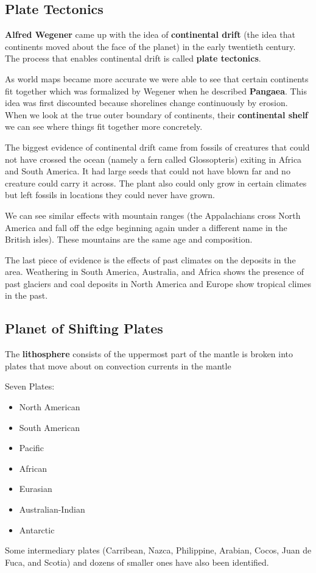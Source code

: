\documentclass{article}
\begin{document}
\subsection{Plate Tectonics} %
\label{sub:plate_tectonics}
\textbf{Alfred Wegener} came up with the idea of \textbf{continental drift} (the idea that continents moved about the face of the planet) in the early twentieth century. The process that enables continental drift is called \textbf{plate tectonics}.

As world maps became more accurate we were able to see that certain continents fit together which was formalized by Wegener when he described \textbf{Pangaea}. This idea was first discounted because shorelines change continuously by erosion. When we look at the true outer boundary of continents, their \textbf{continental shelf} we can see where things fit together more concretely.

The biggest evidence of continental drift came from fossils of creatures that could not have crossed the ocean (namely a fern called Glossopteris) exiting in Africa and South America. It had large seeds that could not have blown far and no creature could carry it across. The plant also could only grow in certain climates but left fossils in locations they could never have grown.

We can see similar effects with mountain ranges (the Appalachians cross North America and fall off the edge beginning again under a different name in the British isles). These mountains are the same age and composition.

The last piece of evidence is the effects of past climates on the deposits in the area. Weathering in South America, Australia, and Africa shows the presence of past glaciers and coal deposits in North America and Europe show tropical climes in the past.

\subsection{Planet of Shifting Plates} %
\label{sub:planet_of_shifting_plates}
The \textbf{lithosphere} consists of the uppermost part of the mantle is broken into plates that move about on convection currents in the mantle

Seven Plates:
\begin{itemize}
    \item North American
    \item South American
    \item Pacific
    \item African
    \item Eurasian
    \item Australian-Indian
    \item Antarctic
\end{itemize}
Some intermediary plates (Carribean, Nazca, Philippine, Arabian, Cocos, Juan de Fuca, and Scotia) and dozens of smaller ones have also been identified.
\end{document}
